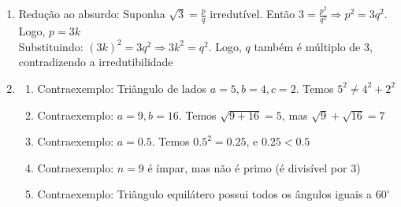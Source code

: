 \begin{enumerate}
\begin{enumerate}
    \item
        Demonstração Direta: Sejam $n = 2k + 1$ e $m = 2j + 1$. A soma é $(2k + 1) + (2j + 1) = 2(k + j + 1)$, que é par \\
        Redução ao Absurdo: Suponha que $2k+1 + 2j+1 = 2p + 1$. Então $2(k + j - p +1) = 1$, o que é uma contradição (par igual a ímpar)

    \item
        Demonstração Direta: Sejam $n = 2k + 1$ e $m = 2j + 1$. O produto é $4kj + 2k + 2j + 1 = 2(2kj + k + j) + 1$, que é ímpar \\
        Redução ao Absurdo: Suponha que o produto seja par ($2p$). Então $2(2kj+k+j) + 1 = 2p \Rightarrow 1 = 2(p - 2kj - k - j)$, o que é uma contradição (par igual a ímpar)

    \item
        Usando a Contrapositiva: Se $x=2k$, então $x^2 = 4k^2 = 2(2k^2)$, que é par. Provada a contrapositiva, a original é verdadeira \\
        Redução ao Absurdo: Suponha que $x$ é par. Então $x^2 = (2k)^2 = 2(2k^2)$ que é par, o que contradiz a hipótese de $x^2$ ser ímpar

    \item
        Demonstração Direta: Se $x + y = 2k$, então $x - y = (x + y) - 2y = 2k - 2y = 2(k - y)$, que é divisível por 2 \\
        Redução ao Absurdo: Suponha que $x - y$ seja ímpar ($2j+1$). Somando com $x+y=2k$, teríamos $2x = 2(k+j)+1$, o que é uma contradição (par igual a ímpar)
\end{enumerate}

    \item
    Redução ao absurdo: Suponha $\sqrt{3} = \frac{p}{q}$ irredutível. Então $3 = \frac{p^2}{q^2} \Rightarrow p^2 = 3q^2$. Logo, $p = 3k$ \\ Substituindo: $(3k)^2 = 3q^2 \Rightarrow 3k^2 = q^2$. Logo, $q$ também é múltiplo de 3, contradizendo a irredutibilidade

    \item
    \begin{enumerate}
        \item Contraexemplo: Triângulo de lados $a=5, b=4, c=2$. Temos $5^2 \neq 4^2 + 2^2$
        \item Contraexemplo: $a=9, b=16$. Temos $\sqrt{9+16}=5$, mas $\sqrt{9}+\sqrt{16}=7$
        \item Contraexemplo: $a=0.5$. Temos $0.5^2 = 0.25$, e $0.25 < 0.5$
        \item Contraexemplo: $n=9$ é ímpar, mas não é primo (é divisível por 3)
        \item Contraexemplo: Triângulo equilátero possui todos os ângulos iguais a $60^\circ$
    \end{enumerate}
\end{enumerate}